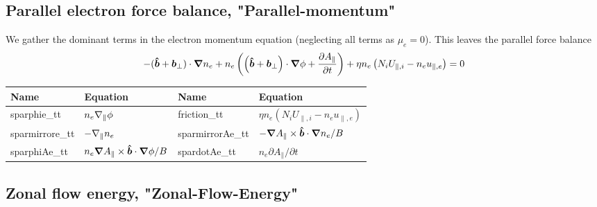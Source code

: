 \subsection{Parallel electron force balance, "Parallel-momentum"}
We gather the dominant terms in the electron momentum equation (neglecting all terms as $\mu_e=0$). This leaves the parallel force balance
\begin{align}
    -(\bm{\hat{b}} + {\boldsymbol{b}}_\perp) \cdot{\boldsymbol{\nabla}} n_e +n_e\left( \left( \bm{\hat{b}} + {\boldsymbol{b}}_\perp \right) \cdot{\boldsymbol{\nabla}} \phi + \frac{\partial A_\parallel}{\partial t} \right) +\eta n_e \left( N_iU_{\parallel,i} - n_eu_{\parallel,e}\right) = 0
\end{align}
\begin{longtable}{llll}
\toprule
\rowcolor{gray!50}\textbf{Name} &  \textbf{Equation} &
\textbf{Name} &  \textbf{Equation}\\
\midrule
    sparphie\_tt & $n_e\nabla_\parallel \phi$ &
    friction\_tt & $ \eta n_e(N_iU_{\parallel,i}-n_eu_{\parallel,e})$ \\
    sparmirrore\_tt & $-\nabla_\parallel n_e$ &
    sparmirrorAe\_tt & $-{\boldsymbol{\nabla}} A_\parallel \times \bm{\hat{b}} \cdot{\boldsymbol{\nabla}} n_e /B$ \\
    sparphiAe\_tt & $n_e {\boldsymbol{\nabla}} A_\parallel \times \bm{\hat{b}} \cdot{\boldsymbol{\nabla}} \phi /B$ &
    spardotAe\_tt & $ n_e \partial A_\parallel /\partial t$ \\
\bottomrule
\end{longtable}




\subsection{Zonal flow energy, "Zonal-Flow-Energy"}

